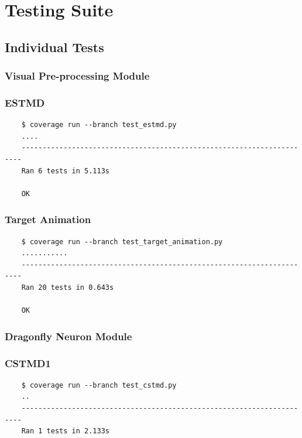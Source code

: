 \documentclass[a4paper,11pt]{article}
\begin{document}
\begin{appendices}
\begin{table}[h]
\begin{tabular}{|l|l|l|}
\end{tabular}
\end{table}

\clearpage
\section{Testing Suite}
\subsection{Individual Tests}
\subsubsection{Visual Pre-processing Module}
\subsubsection*{{\hspace{6mm}}ESTMD}
\begin{verbatim}
    $ coverage run --branch test_estmd.py
    ....
    ----------------------------------------------------------------------
    Ran 6 tests in 5.113s

    OK
\end{verbatim}
\subsubsection*{{\hspace{6mm}}Target Animation}
\begin{verbatim}
    $ coverage run --branch test_target_animation.py
    ...........
    ----------------------------------------------------------------------
    Ran 20 tests in 0.643s

    OK
\end{verbatim}

\subsubsection{Dragonfly Neuron Module}
\subsubsection*{{\hspace{6mm}}CSTMD1}
\begin{verbatim}
    $ coverage run --branch test_cstmd.py
    ..
    ----------------------------------------------------------------------
    Ran 1 tests in 2.133s


\end{verbatim}
\end{appendices}
\end{document}
